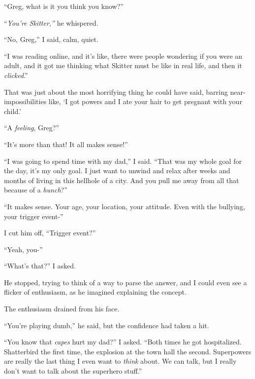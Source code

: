 ``Greg, what is it you think you know?''



``\emph{You're Skitter,'' }he whispered.



``No, Greg,'' I said, calm, quiet.



``I was reading online, and it's like, there were people wondering if you were an adult, and it got me thinking what Skitter must be like in real life, and then it \emph{clicked}.''



That was just about the most horrifying thing he could have said, barring near-impossibilities like, `I got powers and I ate your hair to get pregnant with your child.'



``A \emph{feeling}, Greg?''



``It's more than that!  It all makes sense!''



``I was going to spend time with my dad,'' I said.  ``That was my whole goal for the day, it's my only goal.  I just want to unwind and relax after weeks and months of living in this hellhole of a city.  And you pull me away from all that because of a \emph{hunch}?''



``It makes sense.  Your age, your location, your attitude.  Even with the bullying, your trigger event-''



I cut him off, ``Trigger event?''



``Yeah, you-''



``What's that?'' I asked.



He stopped, trying to think of a way to parse the answer, and I could even see a flicker of enthusiasm, as he imagined explaining the concept.



The enthusiasm drained from his face.



``You're playing dumb,'' he said, but the confidence had taken a hit.



``You know that \emph{capes} hurt my dad?'' I asked.  ``Both times he got hospitalized.  Shatterbird the first time, the explosion at the town hall the second.   Superpowers are really the last thing I even want to \emph{think} about.  We can talk, but I really don't want to talk about the superhero stuff.''



